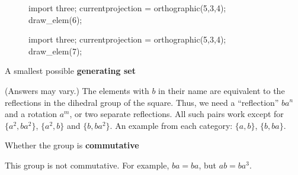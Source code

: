 \documentclass[../key.tex]{subfiles}
\begin{document}
\begin{figure}[h]
	\begin{center}
		\begin{minipage}[b]{0.45\textwidth}
			\centering
			\begin{asy}[width=0.65\textwidth]
				import three;
				currentprojection = orthographic(5,3,4);
				draw_elem(6);
			\end{asy}
		\end{minipage}
		\hfill
		\begin{minipage}[b]{0.45\textwidth}
			\centering
			\begin{asy}[width=0.7\textwidth]
				import three;
				currentprojection = orthographic(5,3,4);
				draw_elem(7);
			\end{asy}
		\end{minipage}
	\end{center}
	\vspace*{-2\baselineskip}
	\begin{center}
		\begin{minipage}[t]{\textwidth}
			\label{fig:this_took_me_so_long}
		\end{minipage}
	\end{center}
	\vspace*{-2\baselineskip}
\end{figure}

\begin{inner_problem}
\item A smallest possible \textbf{generating set}
\end{inner_problem}

\noindent(Answers may vary.)
The elements with $b$ in their name are equivalent to the reflections in the dihedral group of the square. Thus, we need a ``reflection'' $ba^n$ and a rotation $a^m$, or two separate reflections. All such pairs work except for $\{a^2,ba^2\}$, $\{a^2,b\}$ and $\{b,ba^2\}$. An example from each category: $\{a,b\}$, $\{b,ba\}$.

\begin{inner_problem}
\item Whether the group is \textbf{commutative}
\end{inner_problem}

\noindent This group is not commutative. For example, $ba=ba$, but $ab=ba^3$.
\end{document}
